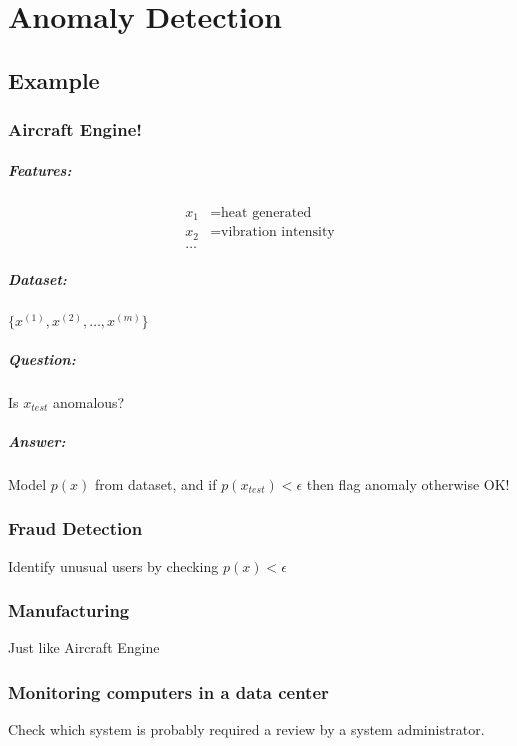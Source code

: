 \chapter{Anomaly Detection}
\section{Example}
\subsection{Aircraft Engine!}
\paragraph{Features:}
\begin{align*}
    x_1 & = \text{heat generated}      \\
    x_2 & = \text{vibration intensity} \\
    \dots
\end{align*}
\paragraph{Dataset:} $\{x^{(1)}, x^{(2)}, \dots, x^{(m)}\}$
\paragraph{Question:} Is $x_{test}$ anomalous?
\paragraph{Answer:} Model $p(x)$ from dataset, and if $p(x_{test}) < \epsilon$
then flag anomaly otherwise OK!

\subsection{Fraud Detection}
Identify unusual users by checking $p(x) < \epsilon$

\subsection{Manufacturing}
Just like Aircraft Engine

\subsection{Monitoring computers in a data center}
Check which system is probably required a review by a system administrator.

